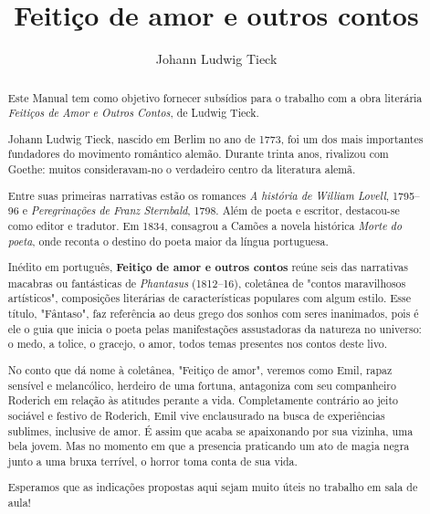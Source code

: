 \documentclass[11pt]{extarticle}
\begin{document}
\newcommand{\AutorLivro}{Johann Ludwig Tieck}
\newcommand{\TituloLivro}{Feitiço de amor e outros contos}
\newcommand{\Tema}{Ficção, mistério e fantasia}
\newcommand{\Genero}{Conto, crônica e novela}
\newcommand{\imagemCapa}{./images/PNLD0041-01.png}
\newcommand{\issnppub}{---}
\newcommand{\issnepub}{---}
\newcommand{\colaborador}{\textbf{Michelle Etienne Florence, Bruno Gradella e Vicente Castro} é uma pessoa incrível e vai fazer um bom serviço.}


\title{\TituloLivro}
\author{\AutorLivro}
\def\authornotes{\colaborador}

\date{}
\maketitle

\baselineskip\par

\begin{abstract}
Este Manual tem como objetivo fornecer subsídios para o trabalho com a
obra literária \emph{Feitiços de Amor e Outros Contos}, de Ludwig Tieck.

Johann Ludwig Tieck, nascido em Berlim no ano de 1773, foi um dos mais 
importantes fundadores do movimento romântico alemão. Durante trinta anos, 
rivalizou com Goethe: muitos consideravam-no o verdadeiro centro da
literatura alemã. 

Entre suas primeiras narrativas estão os romances \emph{A história de William 
Lovell}, 1795–96 e \emph{Peregrinações de Franz Sternbald}, 1798. Além de poeta 
e escritor, destacou-se como editor e tradutor. Em 1834, consagrou a Camões
a novela histórica \emph{Morte do poeta}, onde reconta o destino do poeta 
maior da língua portuguesa. 

Inédito em português, \textbf{Feitiço de amor e outros contos} reúne seis das 
narrativas macabras ou fantásticas de \textit{Phantasus} (1812--16), coletânea 
de "contos maravilhosos artísticos", composições literárias de características 
populares com algum estilo. Esse título, "Fântaso", faz referência ao deus grego 
dos sonhos com seres inanimados, pois é ele o guia que inicia o poeta pelas
manifestações assustadoras da natureza no universo: o medo, a tolice, o gracejo, 
o amor, todos temas presentes nos contos deste livo. 

No conto que dá nome à coletânea, "Feitiço de amor", veremos como Emil, rapaz
sensível e melancólico, herdeiro de uma fortuna, antagoniza com seu companheiro 
Roderich em relação às atitudes perante a vida. Completamente contrário ao jeito
sociável e festivo de Roderich, Emil vive enclausurado na busca de experiências 
sublimes, inclusive de amor. É assim que acaba se apaixonando por sua vizinha, 
uma bela jovem. Mas no momento em que a presencia praticando um ato de magia negra
junto a uma bruxa terrível, o horror toma conta de sua vida. 

Esperamos que as indicações propostas aqui sejam muito úteis no trabalho em
sala de aula! 





\end{abstract}
\end{document}
